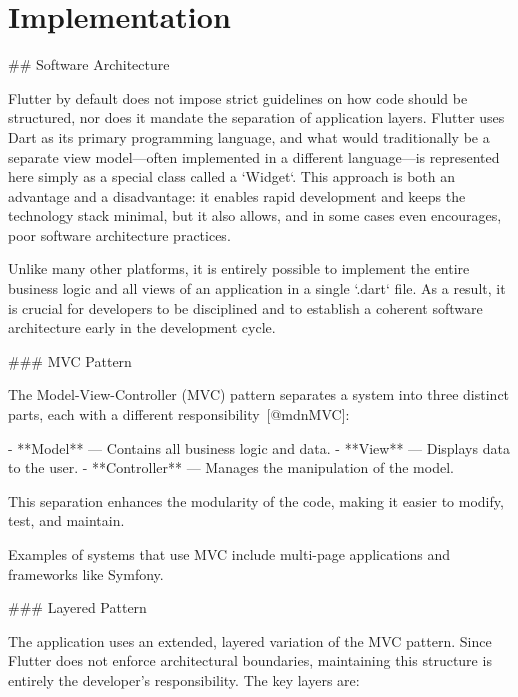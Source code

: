 \documentclass[
  digital,     %
  oneside,     %
  nosansbold,  %
  nocolorbold, %
  lof,         %
  lot,         %
]{fithesis4}
\begin{document}
\shorthandoff{-}
\begin{markdown}
\end{markdown}
\shorthandon{-}

\chapter{Implementation}
\shorthandoff{-}
\begin{markdown}

## Software Architecture

Flutter by default does not impose strict guidelines on how code should be structured, nor does it mandate the separation of application layers. Flutter uses Dart as its primary programming language, and what would traditionally be a separate view model—often implemented in a different language—is represented here simply as a special class called a `Widget`. This approach is both an advantage and a disadvantage: it enables rapid development and keeps the technology stack minimal, but it also allows, and in some cases even encourages, poor software architecture practices.

Unlike many other platforms, it is entirely possible to implement the entire business logic and all views of an application in a single `.dart` file. As a result, it is crucial for developers to be disciplined and to establish a coherent software architecture early in the development cycle.

### MVC Pattern

The Model-View-Controller (MVC) pattern separates a system into three distinct parts, each with a different responsibility~[@mdnMVC]:

- **Model** — Contains all business logic and data.
- **View** — Displays data to the user.
- **Controller** — Manages the manipulation of the model.

This separation enhances the modularity of the code, making it easier to modify, test, and maintain.

Examples of systems that use MVC include multi-page applications and frameworks like Symfony.

### Layered Pattern

The application uses an extended, layered variation of the MVC pattern. Since Flutter does not enforce architectural boundaries, maintaining this structure is entirely the developer's responsibility. The key layers are:


\end{markdown}
\end{document}
